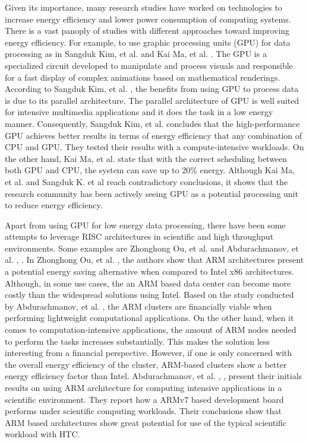 Given its importance, many research studies have worked on technologies to increase energy efficiency and lower power consumption of computing systems. There is a vast panoply of studies with different
approaches toward improving energy efficiency. For example, to use graphic processing units (GPU) for data processing as in Sangduk Kim, et al. \cite{GPU} and Kai Ma, et al. \cite{GREENGPU}. The GPU is a specialized circuit developed to manipulate and process visuals and responsible for a fast display of complex animations based on mathematical renderings. According to Sangduk Kim, et al. \cite{GPU}, the benefits from using GPU to process data is due to its parallel architecture. The parallel architecture of GPU is well suited for intensive multimedia applications and it does the task in a low energy manner. Consequently, Sangduk Kim, et al. \cite{GPU} concludes that the high-performance GPU achieves better results in terms of energy efficiency that any combination of CPU and GPU. They tested their results with a compute-intensive workloads. On the other hand, Kai Ma, et al. \cite{GREENGPU} state that with the correct scheduling between both GPU and CPU, the system can save up to 20\% energy. Although Kai Ma, et al. \cite{GREENGPU} and Sangduk K. et al \cite{GPU} reach contradictory conclusions, it shows that the research community has been actively seeing GPU as a potential processing unit to reduce energy efficiency.

Apart from using GPU for low energy data processing, there have been some attempts to leverage RISC architectures in scientific and high throughput environments. Some examples are Zhonghong Ou, et al. \cite{AALTO_ARM} and Abdurachmanov, et al. \cite{ACAT13ARM},
\cite{ACAT14ARMDAVID}. In Zhonghong Ou, et al. \cite{AALTO_ARM}, the authors show that ARM architectures present a potential energy saving alternative when compared to Intel x86 architectures. Although, in some use cases, the an ARM based data center can become more costly than the widespread solutions using Intel. Based on the study conducted by Abdurachmanov, et al. \cite{AALTO_ARM}, the ARM clusters are financially viable when performing lightweight computational applications. On the other hand, when it comes to computation-intensive applications, the amount of ARM nodes needed to perform the tasks increases substantially. This makes the solution less interesting from a financial perspective. However, if one is only concerned with the overall energy efficiency of the cluster, ARM-based clusters show a better energy efficiency factor than Intel. Abdurachmanov, et al. \cite{ACAT13ARM}, \cite{ACAT14ARMDAVID}, present their initials results on using ARM architecture for computing intensive applications in a scientific environment. They report how a ARMv7 based development board performs under scientific computing workloads. Their conclusions show that ARM based architectures show great potential for use of the typical scientific workload with HTC.

